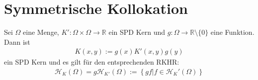 \section{Symmetrische Kollokation}
\begin{theorem}
\label{thm:gewichtKern}
Sei $\Omega$ eine Menge, $K':\Omega \times \Omega \rightarrow \mathbb{R}$ ein \ac{SPD} Kern und $g:\Omega \rightarrow \mathbb{R} \setminus \{0\}$ eine Funktion. Dann ist 
\begin{align*}
K(x,y) := g(x)K'(x,y)g(y)
\end{align*}
ein \gls{SPD} Kern und es gilt für den entsprechenden \ac{RKHR}:
\begin{align*}
\mathcal{H}_{K}(\Omega) = g \mathcal{H}_{K'}(\Omega) := \left\{ gf|f \in \mathcal{H}_K'(\Omega)\right\}
\end{align*}
\end{theorem}

